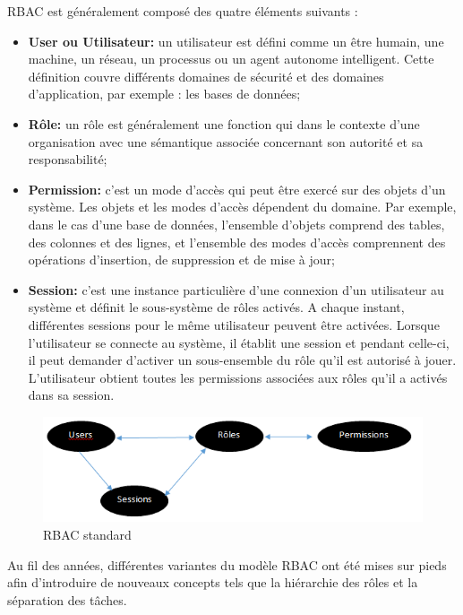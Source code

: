 RBAC est généralement composé des quatre éléments suivants \cite{bellettini01} :

\begin{itemize}
\item \textbf{User ou Utilisateur:} un utilisateur est défini comme un être humain, une machine, un réseau, un processus ou un agent autonome intelligent. Cette définition couvre différents domaines de sécurité et des domaines d'application, par exemple : les bases de données;
\item \textbf{Rôle:} un rôle est généralement une fonction qui dans le contexte d'une organisation avec une sémantique associée concernant son autorité et sa responsabilité;
\item \textbf{Permission:} c'est un mode d'accès qui peut être exercé sur des objets d'un système. Les objets et les modes d'accès dépendent du domaine. Par exemple, dans le cas d'une base de données, l'ensemble d'objets comprend des tables, des colonnes et des lignes, et l'ensemble des modes d'accès comprennent des opérations d'insertion, de suppression et de mise à jour;
\item \textbf{Session:} c'est une instance particulière d'une connexion d'un utilisateur au système et définit le sous-système de rôles activés. A chaque instant, différentes sessions pour le même utilisateur peuvent être activées. Lorsque l'utilisateur se connecte au système, il établit une session et pendant celle-ci, il peut demander d'activer un sous-ensemble du rôle qu'il est autorisé à jouer. L'utilisateur obtient toutes les permissions associées aux rôles qu'il a activés dans sa session.
\end{itemize}

\begin{figure}[h!]
    \centering
		\includegraphics[scale=0.7]{chap2/images/rbac.png}
    \caption{RBAC standard \cite{bellettini01}}
	 \label{figRbac}
\end{figure}

\hspace*{0.5cm} Au fil des années, différentes variantes du modèle RBAC ont été mises sur pieds afin d'introduire de nouveaux concepts tels que la hiérarchie des rôles et la séparation des tâches.

